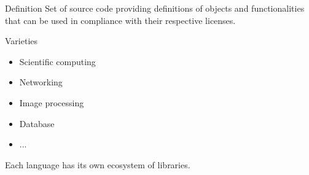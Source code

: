 \begin{frame}{Definition}
    Set of source code providing definitions of objects and functionalities that can be used in compliance with their respective licenses.
\end{frame}

\begin{frame}{Varieties}
    \begin{itemize}
        \item Scientific computing
        \item Networking
        \item Image processing
        \item Database
        \item ...
    \end{itemize}
    Each language has its own ecosystem of libraries.
\end{frame}